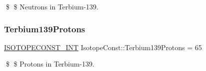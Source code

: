 \$ \$ Neutrons in Terbium-\/139. \mbox{\label{group___isotope_const-_terbium-_tb139_gaaf4009f77c4c92bd6996372f2d97c5cf}} 
\subsubsection{\texorpdfstring{Terbium139\+Protons}{Terbium139Protons}}
{\footnotesize\ttfamily \mbox{\hyperlink{group___isotope_const-_macros_ga5f18360b3e99483a35c32d789e62621c}{I\+S\+O\+T\+O\+P\+E\+C\+O\+N\+S\+T\+\_\+\+I\+NT}} Isotope\+Const\+::\+Terbium139\+Protons = 65}

\$ \$ Protons in Terbium-\/139. 